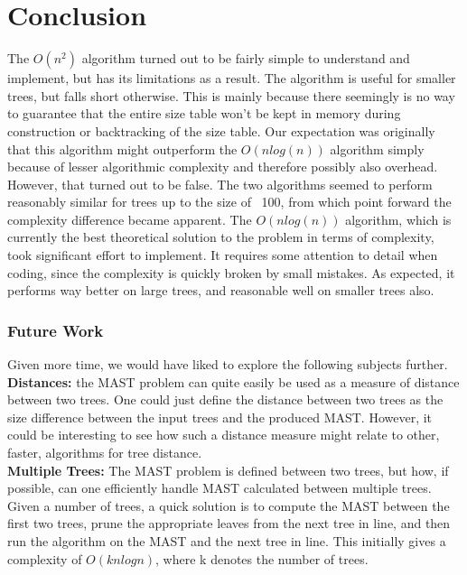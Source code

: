 \chapter{Conclusion}
\label{ch:conclusion}
The $O(n^2)$ algorithm turned out to be fairly simple to understand and implement, but has its limitations as a result. The algorithm is useful for smaller trees, but falls short otherwise. This is mainly because there seemingly is no way to guarantee that the entire size table won't be kept in memory during construction or backtracking of the size table. Our expectation was originally that this algorithm might outperform the $O(nlog(n))$ algorithm simply because of lesser algorithmic complexity and therefore possibly also overhead. However, that turned out to be false. The two algorithms seemed to perform reasonably similar for trees up to the size of ~100, from which point forward the complexity difference became apparent.
The $O(nlog(n))$ algorithm, which is currently the best theoretical solution to the problem in terms of complexity, took significant effort to implement. It requires some attention to detail when coding, since the complexity is quickly broken by small mistakes. As expected, it performs way better on large trees, and reasonable well on smaller trees also.

\subsection{Future Work}
Given more time, we would have liked to explore the following subjects further.\\

\noindent\textbf{Distances:} the MAST problem can quite easily be used as a measure of distance between two trees. One could just define the distance between two trees as the size difference between the input trees and the produced MAST. However, it could be interesting to see how such a distance measure might relate to other, faster, algorithms for tree distance. \\ 

\noindent\textbf{Multiple Trees:} The MAST problem is defined between two trees, but how, if possible, can one efficiently handle MAST calculated between multiple trees. Given a number of trees, a quick solution is to compute the MAST between the first two trees, prune the appropriate leaves from the next tree in line, and then run the algorithm on the MAST and the next tree in line. This initially gives a complexity of $O(knlogn)$, where k denotes the number of trees. \\   

